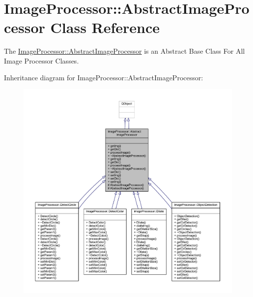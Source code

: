 \hypertarget{class_image_processor_1_1_abstract_image_processor}{}\section{Image\+Processor\+:\+:Abstract\+Image\+Processor Class Reference}
\label{class_image_processor_1_1_abstract_image_processor}


The \hyperlink{class_image_processor_1_1_abstract_image_processor}{Image\+Processor\+::\+Abstract\+Image\+Processor} is an Abstract Base Class For All Image Processor Classes.  




Inheritance diagram for Image\+Processor\+:\+:Abstract\+Image\+Processor\+:\nopagebreak
\begin{figure}[H]
\begin{center}
\leavevmode
\includegraphics[width=350pt]{d5/d49/class_image_processor_1_1_abstract_image_processor__inherit__graph}
\end{center}
\end{figure}


